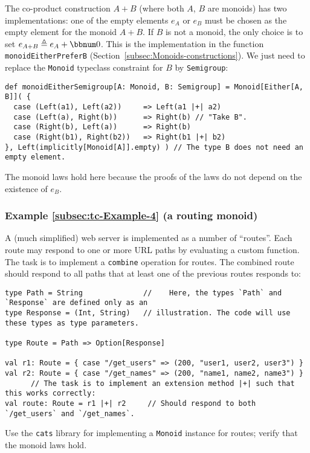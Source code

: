 The co-product construction  $A+B$ (where both $A$, $B$ are monoids)
has two implementations: one of the empty elements $e_{A}$ or $e_{B}$
must be chosen as the empty element for the monoid $A+B$. If $B$
is not a monoid, the only choice is to set $e_{A+B}\triangleq e_{A}+\bbnum 0$.
This is the implementation in the function \lstinline!monoidEitherPreferB!
(Section~\ref{subsec:Monoids-constructions}). We just need to replace
the \lstinline!Monoid! typeclass constraint for $B$ by \lstinline!Semigroup!:
\begin{lstlisting}
def monoidEitherSemigroup[A: Monoid, B: Semigroup] = Monoid[Either[A, B]]( {
  case (Left(a1), Left(a2))     => Left(a1 |+| a2)
  case (Left(a), Right(b))      => Right(b) // "Take B".
  case (Right(b), Left(a))      => Right(b)
  case (Right(b1), Right(b2))   => Right(b1 |+| b2)
}, Left(implicitly[Monoid[A]].empty) ) // The type B does not need an empty element.
\end{lstlisting}
The monoid laws hold here because the proofs of the laws do not depend
on the existence of $e_{B}$.

\subsubsection{Example \label{subsec:tc-Example-4}\ref{subsec:tc-Example-4} (a
routing monoid)}

A (much simplified) web server is implemented as a number of \textsf{``}routes\textsf{''}.
Each route may respond to one or more URL paths by evaluating a custom
function. The task is to implement a \lstinline!combine! operation
for routes. The combined route should respond to all paths that at
least one of the previous routes responds to:
\begin{lstlisting}
type Path = String              //    Here, the types `Path` and `Response` are defined only as an
type Response = (Int, String)   // illustration. The code will use these types as type parameters.

type Route = Path => Option[Response]

val r1: Route = { case "/get_users" => (200, "user1, user2, user3") }
val r2: Route = { case "/get_names" => (200, "name1, name2, name3") }
      // The task is to implement an extension method |+| such that this works correctly:
val route: Route = r1 |+| r2     // Should respond to both `/get_users` and `/get_names`.
\end{lstlisting}
Use the \texttt{cats} library for implementing a \lstinline!Monoid!
instance for routes; verify that the monoid laws hold.

